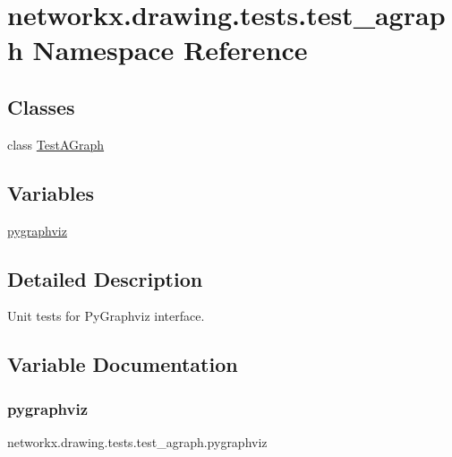 \hypertarget{namespacenetworkx_1_1drawing_1_1tests_1_1test__agraph}{}\section{networkx.\+drawing.\+tests.\+test\+\_\+agraph Namespace Reference}
\label{namespacenetworkx_1_1drawing_1_1tests_1_1test__agraph}
\subsection*{Classes}
\begin{DoxyCompactItemize}
\item 
class \hyperlink{classnetworkx_1_1drawing_1_1tests_1_1test__agraph_1_1TestAGraph}{Test\+A\+Graph}
\end{DoxyCompactItemize}
\subsection*{Variables}
\begin{DoxyCompactItemize}
\item 
\hyperlink{namespacenetworkx_1_1drawing_1_1tests_1_1test__agraph_a767006f1ab789e3af2689ed5d3f5d94c}{pygraphviz}
\end{DoxyCompactItemize}


\subsection{Detailed Description}
\begin{DoxyVerb}Unit tests for PyGraphviz interface.\end{DoxyVerb}
 

\subsection{Variable Documentation}
\mbox{\label{namespacenetworkx_1_1drawing_1_1tests_1_1test__agraph_a767006f1ab789e3af2689ed5d3f5d94c}} 
\subsubsection{\texorpdfstring{pygraphviz}{pygraphviz}}
{\footnotesize\ttfamily networkx.\+drawing.\+tests.\+test\+\_\+agraph.\+pygraphviz}

